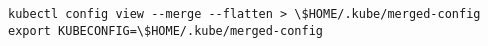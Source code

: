 \begin{verbatim}
kubectl config view --merge --flatten > \$HOME/.kube/merged-config
export KUBECONFIG=\$HOME/.kube/merged-config
\end{verbatim}